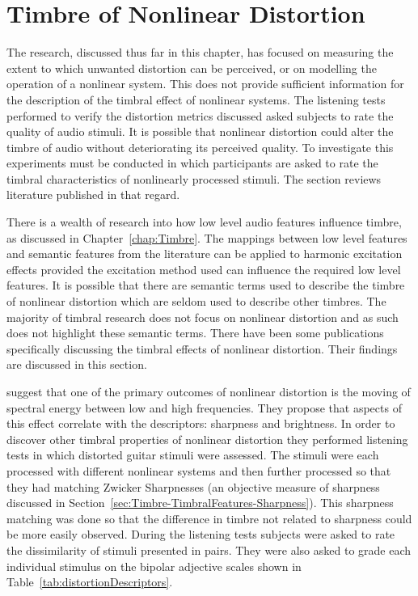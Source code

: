 \section{Timbre of Nonlinear Distortion}
\label{sec:Excitation-Timbre}
	The research, discussed thus far in this chapter, has focused on measuring the extent to which unwanted distortion
	can be perceived, or on modelling the operation of a nonlinear system. This does not provide sufficient information
	for the description of the timbral effect of nonlinear systems. The listening tests performed to verify the
	distortion metrics discussed asked subjects to rate the quality of audio stimuli. It is possible that nonlinear
	distortion could alter the timbre of audio without deteriorating its perceived quality. To investigate this
	experiments must be conducted in which participants are asked to rate the timbral characteristics of nonlinearly
	processed stimuli. The section reviews literature published in that regard.

	There is a wealth of research into how low level audio features influence timbre, as discussed in
	Chapter~\ref{chap:Timbre}. The mappings between low level features and semantic features from the literature can be
	applied to harmonic excitation effects provided the excitation method used can influence the required low level
	features.  It is possible that there are semantic terms used to describe the timbre of nonlinear distortion which
	are seldom used to describe other timbres. The majority of timbral research does not focus on nonlinear distortion
	and as such does not highlight these semantic terms. There have been some publications specifically discussing the
	timbral effects of nonlinear distortion. Their findings are discussed in this section.

	\citet{marui2005predicting} suggest that one of the primary outcomes of nonlinear distortion is the moving of
	spectral energy between low and high frequencies. They propose that aspects of this effect correlate with the
	descriptors: sharpness and brightness. In order to discover other timbral properties of nonlinear distortion they
	performed listening tests in which distorted guitar stimuli were assessed. The stimuli were each processed with
	different nonlinear systems and then further processed so that they had matching Zwicker Sharpnesses (an objective
	measure of sharpness \citep{fastl2007psychoacoustics} discussed in
	Section~\ref{sec:Timbre-TimbralFeatures-Sharpness}). This sharpness matching was done so that the difference in
	timbre not related to sharpness could be more easily observed. During the listening tests subjects were asked to
	rate the dissimilarity of stimuli presented in pairs. They were also asked to grade each individual stimulus on the
	bipolar adjective scales shown in Table~\ref{tab:distortionDescriptors}.

